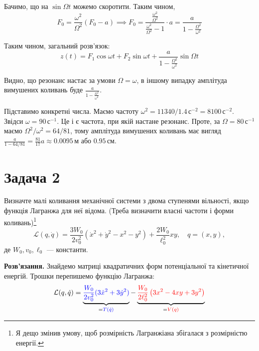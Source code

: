 \documentclass{hw_template}
\begin{document}
Бачимо, що на $\sin \Omega t$ можемо скоротити. Таким чином,
\begin{equation*}
    F_0 = \frac{\omega^2}{\Omega^2}(F_0 - a) \implies F_0 = \frac{\frac{\omega^2}{\Omega^2}}{\frac{\omega^2}{\Omega^2}-1}\cdot a = \frac{a}{1-\frac{\Omega^2}{\omega^2}}
\end{equation*}

Таким чином, загальний розв'язок:
\begin{equation*}
    z(t) = F_1 \cos \omega t + F_2 \sin \omega t + \frac{a}{1-\frac{\Omega^2}{\omega^2}} \sin \Omega t
\end{equation*}

Видно, що резонанс настає за умови $\Omega = \omega$, в іншому випадку амплітуда
вимушених коливань буде $\frac{a}{1-\frac{\Omega^2}{\omega^2}}$.

Підставимо конкретні числа. Маємо частоту $\omega^2 = 11340/1.4 \, \text{с}^{-2}
= 8100 \, \text{с}^{-2}$. Звідси $\omega = 90 \, \text{с}^{-1}$. Це і є частота,
при якій настане резонанс. Проте, за $\Omega=80 \,\text{с}^{-1}$ маємо
$\Omega^2/\omega^2 = 64/81$, тому амплітуда вимушених коливань має вигляд
$\frac{a}{1-64/81} = \frac{81}{17}a \approx 0.0095 \, \text{м}$ або $0.95 \,
\text{см}$. 

\section{Задача 2}

\begin{problem}
    Визначте малі коливання механічної системи з двома ступенями вільності, якщо
функція Лагранжа для неї відома. (Треба визначити власні частоти і форми
коливань)\footnote{Я дещо змінив умову, щоб розмірність Лагранжіана збігалася 
з розмірністю енергії.}
\begin{equation*}
    \mathcal{L}(q,\dot{q}) = \frac{3W_0}{2v_0^2}(\dot{x}^2 + \dot{y}^2 - x^2 - y^2) + \frac{2W_0}{\ell_0^2}xy, \quad q=(x,y),
\end{equation*}
де $W_0,v_0,\ell_0$ --- константи.
\end{problem}

\textbf{Розв'язання.} Знайдемо матриці квадратичних форм потенціальної 
та кінетичної енергій. Трошки перепишемо функцію Лагранжа:
\begin{equation*}
    \mathcal{L}(q,\dot{q}) = \underbrace{\textcolor{blue}{\frac{W_0}{2v_0^2}(3\dot{x}^2 + 3\dot{y}^2)}}_{=\textcolor{blue}{T(\dot{q})}} - \underbrace{\textcolor{red}{\frac{W_0}{2\ell_0^2}\left(3x^2 - 4xy + 3y^2\right)}}_{=\textcolor{red}{V(q)}}
\end{equation*}
\end{document}
